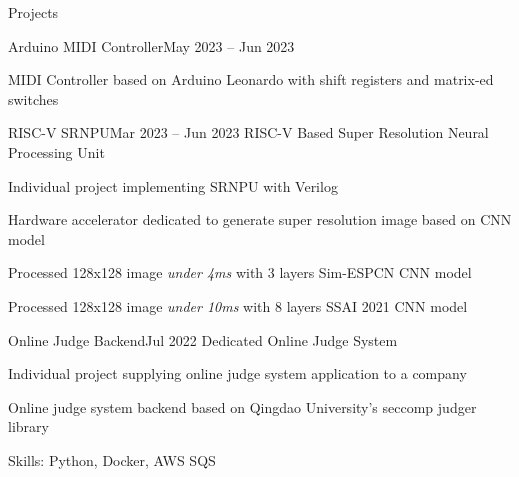 \documentclass{resume}
\begin{document}
\begin{rSection}{Projects}
\begin{rSubsection}{Arduino MIDI Controller}{May 2023 -- Jun 2023}
        \item MIDI Controller based on Arduino Leonardo with shift registers and matrix-ed switches
    \end{rSubsection}

    \begin{rSubsection}{RISC-V SRNPU}{Mar 2023 -- Jun 2023}
        RISC-V Based Super Resolution Neural Processing Unit

        \item Individual project implementing SRNPU with Verilog

        \item Hardware accelerator dedicated to generate super resolution image based on CNN model

        \item Processed 128x128 image \emph{under 4ms} with 3 layers Sim-ESPCN CNN model

        \item Processed 128x128 image \emph{under 10ms} with 8 layers SSAI 2021 CNN model
    \end{rSubsection}

    \begin{rSubsection}{Online Judge Backend}{Jul 2022}
        Dedicated Online Judge System

        \item Individual project supplying online judge system application to a company

        \item Online judge system backend based on Qingdao University's seccomp judger library

        \item Skills: Python, Docker, AWS SQS
    \end{rSubsection}
    
\end{rSection}
\end{document}
